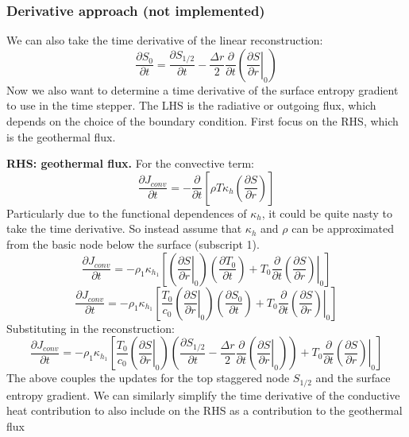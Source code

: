 \subsubsection{Derivative approach (not implemented)}
We can also take the time derivative of the linear reconstruction:
\begin{equation}
\frac{\partial S_0}{\partial t} = \frac{\partial S_{1/2}}{\partial t} - \frac{\Delta r}{2} \frac{\partial}{\partial t} \left( \left. \frac{\partial S}{\partial r}\right|_0 \right)
\end{equation}
Now we also want to determine a time derivative of the surface entropy gradient to use in the time stepper.  The LHS is the radiative or outgoing flux, which depends on the choice of the boundary condition.  First focus on the RHS, which is the geothermal flux.

\textbf{RHS: geothermal flux.}
For the convective term:
\begin{equation}
\frac{\partial J_{conv}}{\partial t} = - \frac{\partial}{\partial t} \left[ \rho T \kappa_h \left( \frac{\partial S}{\partial r} \right) \right]
\end{equation}
Particularly due to the functional dependences of $\kappa_h$, it could be quite nasty to take the time derivative.  So instead assume that $\kappa_h$ and $\rho$ can be approximated from the basic node below the surface (subscript 1).
\begin{equation}
\frac{\partial J_{conv}}{\partial t} = - \rho_1 \kappa_{h_1} \left[ \left(\left.\frac{\partial S}{\partial r}\right|_0 \right) \left( \frac{\partial T_0}{\partial t} \right) + T_0 \frac{\partial}{\partial t} \left. \left(\frac{\partial S}{\partial r}\right) \right|_0  \right]
\end{equation}
\begin{equation}
\frac{\partial J_{conv}}{\partial t} = - \rho_1 \kappa_{h_1} \left[ \frac{T_0}{c_0} \left(\left.\frac{\partial S}{\partial r}\right|_0 \right) \left( \frac{\partial S_0}{\partial t} \right) + T_0 \frac{\partial}{\partial t} \left. \left(\frac{\partial S}{\partial r}\right) \right|_0  \right]
\end{equation}
Substituting in the reconstruction:
\begin{equation}
\frac{\partial J_{conv}}{\partial t} = - \rho_1 \kappa_{h_1} \left[ \frac{T_0}{c_0} \left(\left.\frac{\partial S}{\partial r}\right|_0 \right) \left( \frac{\partial S_{1/2}}{\partial t} - \frac{\Delta r}{2} \frac{\partial}{\partial t} \left( \left. \frac{\partial S}{\partial r}\right|_0 \right) \right) + T_0 \frac{\partial}{\partial t} \left. \left(\frac{\partial S}{\partial r}\right) \right|_0  \right]
\end{equation}
The above couples the updates for the top staggered node $S_{1/2}$ and the surface entropy gradient.  We can similarly simplify the time derivative of the conductive heat contribution to also include on the RHS as a contribution to the geothermal flux

